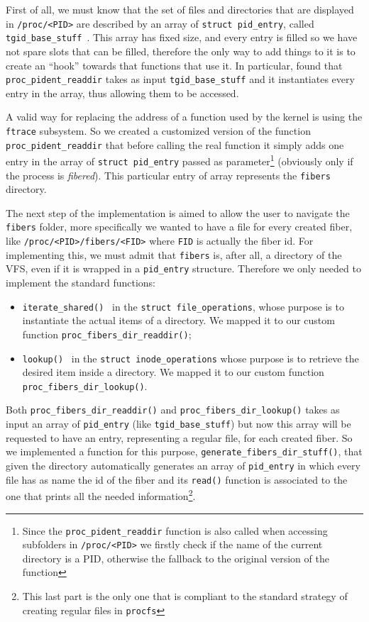 \documentclass[a4paper,10pt]{article}
\begin{document}
First of all, we must know that the set of files and directories that are displayed in \lstinline{/proc/<PID>} are described by an array of \lstinline{struct pid_entry}, called \lstinline{tgid_base_stuff}~\cite{kern_tgid_base_stuff}. This array has fixed size, and every entry is filled so we have not spare slots that can be filled, therefore the only way to add things to it is to create an ``hook'' towards that functions that use it. In particular, found that \lstinline{proc_pident_readdir} takes as input \lstinline{tgid_base_stuff} and it instantiates every entry in the array, thus allowing them to be accessed.

A valid way for replacing the address of a function used by the kernel is using the \lstinline{ftrace} subsystem. So we created a customized version of the function \lstinline{proc_pident_readdir} that before calling the real function it simply adds one entry in the array of \lstinline{struct pid_entry} passed as parameter\footnote{Since the \lstinline{proc_pident_readdir} function is also called when accessing subfolders in \lstinline{/proc/<PID>} we firstly check if the name of the current directory is a PID, otherwise the fallback to the original version of the function} (obviously only if the process is \textit{fibered}). This particular entry of array represents the \texttt{fibers} directory.

The next step of the implementation is aimed to allow the user to navigate the \texttt{fibers} folder, more specifically we wanted to have a file for every created fiber, like \lstinline{/proc/<PID>/fibers/<FID>} where \texttt{FID} is actually the fiber id. For implementing this, we must admit that \texttt{fibers} is, after all, a directory of the VFS, even if it is wrapped in a \lstinline{pid_entry} structure. Therefore we only needed to implement the standard functions:
\begin{itemize}
	\item \lstinline{iterate_shared()}~\cite{kern_file_ops_iterate} in the \lstinline{struct file_operations}, whose purpose is to instantiate the actual items of a directory. We mapped it to our custom function \lstinline{proc_fibers_dir_readdir()};
	\item \lstinline{lookup()}~\cite{kern_inode_ops_lookup} in the \lstinline{struct inode_operations} whose purpose is to retrieve the desired item inside a directory. We mapped it to our custom function \lstinline{proc_fibers_dir_lookup()}.
\end{itemize}
Both \lstinline{proc_fibers_dir_readdir()} and \lstinline{proc_fibers_dir_lookup()} takes as input an array of \lstinline{pid_entry} (like \lstinline{tgid_base_stuff}) but now this array will be requested to have an entry, representing a regular file, for each created fiber. So we implemented a function for this purpose, \lstinline{generate_fibers_dir_stuff()}, that given the directory automatically generates an array of \lstinline{pid_entry} in which every file has as name the id of the fiber and its \lstinline{read()} function is associated to the one that prints all the needed information\footnote{This last part is the only one that is compliant to the standard strategy of creating regular files in \texttt{procfs}}.
\end{document}
